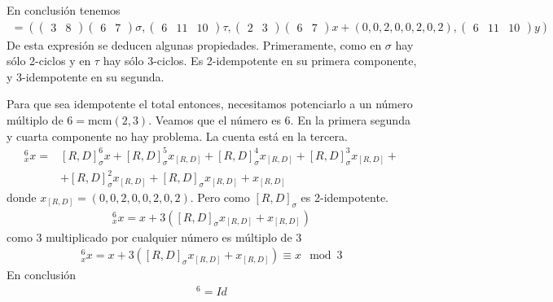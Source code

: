 \documentclass{article}
\theoremstyle{definition}
\begin{document}
En conclusión tenemos
\begin{align*}
    [R,D]=\left(\begin{pmatrix}
                    3 & 8
                \end{pmatrix}\begin{pmatrix}
                                 6 & 7
                             \end{pmatrix}\sigma,\begin{pmatrix}
                                                     6 & 11 & 10
                                                 \end{pmatrix}\tau,\begin{pmatrix}
                                                                       2 & 3
                                                                   \end{pmatrix}\begin{pmatrix}
                                                                                    6 & 7
                                                                                \end{pmatrix}x+(0,0,2,0,0,2,0,2),\begin{pmatrix}
                                                                                                                     6 & 11 & 10
                                                                                                                 \end{pmatrix}y\right)
\end{align*}
De esta expresión se deducen algunas propiedades. Primeramente, como en $\sigma$ hay sólo 2-ciclos y en $\tau$ hay sólo 3-ciclos. Es 2-idempotente en su primera componente, y 3-idempotente en su segunda.

Para que sea idempotente el total entonces, necesitamos potenciarlo a un número múltiplo de $6=\text{mcm}(2,3)$. Veamos que el número es $6$. En la primera segunda y cuarta componente no hay problema. La cuenta está en la tercera.
\begin{align*}
    [R,D]^6_x x= & [R,D]_\sigma^6 x+[R,D]_\sigma^5x_{[R,D]}+[R,D]_\sigma^4x_{[R,D]}+[R,D]_\sigma^3x_{[R,D]}+ \\
                 & +[R,D]_\sigma^2x_{[R,D]}+[R,D]_\sigma x_{[R,D]}+x_{[R,D]}
\end{align*}
donde $x_{[R,D]}=(0,0,2,0,0,2,0,2)$. Pero como $[R,D]_\sigma$ es 2-idempotente.
\begin{align*}
    [R,D]^6_x x=x+3\left([R,D]_\sigma x_{[R,D]}+x_{[R,D]}\right)
\end{align*}
como $3$ multiplicado por cualquier número es múltiplo de $3$
\begin{align*}
    [R,D]^6_x x=x+3\left([R,D]_\sigma x_{[R,D]}+x_{[R,D]}\right)\equiv x\mod 3
\end{align*}
En conclusión
\begin{align*}
    [R,D]^6=Id
\end{align*}
\end{document}
